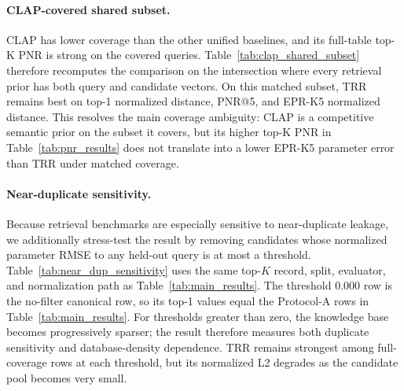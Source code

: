 \begin{table}[t]
\centering
\caption{CLAP-covered shared query and knowledge-base subset. The comparison uses the 173 queries and 829 candidate presets for which all listed retrieval methods have vectors. Lower Norm.L2 is better; higher PNR@5 is better.}
\label{tab:clap_shared_subset}
\small
\setlength{\tabcolsep}{4pt}
\end{table}

\paragraph{CLAP-covered shared subset.}
CLAP has lower coverage than the other unified baselines, and its full-table top-K PNR is strong on the covered queries. Table~\ref{tab:clap_shared_subset} therefore recomputes the comparison on the intersection where every retrieval prior has both query and candidate vectors. On this matched subset, TRR remains best on top-1 normalized distance, PNR@5, and EPR-K5 normalized distance. This resolves the main coverage ambiguity: CLAP is a competitive semantic prior on the subset it covers, but its higher top-K PNR in Table~\ref{tab:pnr_results} does not translate into a lower EPR-K5 parameter error than TRR under matched coverage.

\paragraph{Near-duplicate sensitivity.}
Because retrieval benchmarks are especially sensitive to near-duplicate leakage, we additionally stress-test the result by removing candidates whose normalized parameter RMSE to any held-out query is at most a threshold. Table~\ref{tab:near_dup_sensitivity} uses the same top-$K$ record, split, evaluator, and normalization path as Table~\ref{tab:main_results}. The threshold 0.000 row is the no-filter canonical row, so its top-1 values equal the Protocol-A rows in Table~\ref{tab:main_results}. For thresholds greater than zero, the knowledge base becomes progressively sparser; the result therefore measures both duplicate sensitivity and database-density dependence. TRR remains strongest among full-coverage rows at each threshold, but its normalized L2 degrades as the candidate pool becomes very small.

